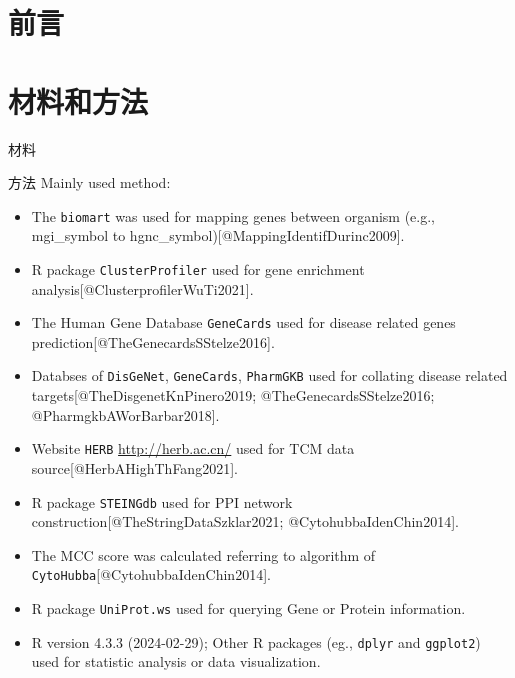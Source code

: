 \documentclass[
  ignorenonframetext,
]{beamer}
\providecommand{\tightlist}{%
  \setlength{\itemsep}{0pt}\setlength{\parskip}{0pt}}
\begin{document}
\hypertarget{introduction}{%
\section{前言}\label{introduction}}

\hypertarget{methods}{%
\section{材料和方法}\label{methods}}

\begin{frame}{材料}
\protect\hypertarget{ux6750ux6599}{}
\end{frame}

\begin{frame}[fragile]{方法}
\protect\hypertarget{ux65b9ux6cd5}{}
Mainly used method:

\begin{itemize}
\tightlist
\item
  The \texttt{biomart} was used for mapping genes between organism
  (e.g., mgi\_symbol to hgnc\_symbol){[}@MappingIdentifDurinc2009{]}.
\item
  R package \texttt{ClusterProfiler} used for gene enrichment
  analysis{[}@ClusterprofilerWuTi2021{]}.
\item
  The Human Gene Database \texttt{GeneCards} used for disease related
  genes prediction{[}@TheGenecardsSStelze2016{]}.
\item
  Databses of \texttt{DisGeNet}, \texttt{GeneCards}, \texttt{PharmGKB}
  used for collating disease related targets{[}@TheDisgenetKnPinero2019;
  @TheGenecardsSStelze2016; @PharmgkbAWorBarbar2018{]}.
\item
  Website \texttt{HERB} \url{http://herb.ac.cn/} used for TCM data
  source{[}@HerbAHighThFang2021{]}.
\item
  R package \texttt{STEINGdb} used for PPI network
  construction{[}@TheStringDataSzklar2021; @CytohubbaIdenChin2014{]}.
\item
  The MCC score was calculated referring to algorithm of
  \texttt{CytoHubba}{[}@CytohubbaIdenChin2014{]}.
\item
  R package \texttt{UniProt.ws} used for querying Gene or Protein
  information.
\item
  R version 4.3.3 (2024-02-29); Other R packages (eg., \texttt{dplyr}
  and \texttt{ggplot2}) used for statistic analysis or data
  visualization.
\end{itemize}
\end{frame}
\end{document}
